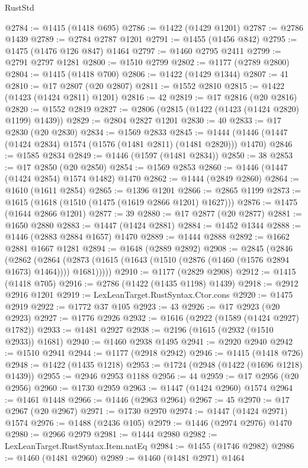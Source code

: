 \begin{lexlean}{RustStd}
\begin{coremodule}
@2784 := @1415 (@1418 @695)
@2786 := @1422 (@1429 @1201)
@2787 := @2786 @1439
@2789 := @2784 @2787 @1201
@2791 := @1455 (@1456 @842)
@2795 := @1475 (@1476 @126 @847) @1464
@2797 := @1460 @2795 @2411
@2799 := @2791 @2797 @1281
@2800 := @1510 @2799
@2802 := @1177 (@2789 @2800)
@2804 := @1415 (@1418 @700)
@2806 := @1422 (@1429 @1344)
@2807 := 41
@2810 := @17 @2807 (@20 @2807)
@2811 := @1552 @2810
@2815 := @1422 (@1423 (@1424 @2811) @1201)
@2816 := 42
@2819 := @17 @2816 (@20 @2816)
@2820 := @1552 @2819
@2827 := @2806 (@2815 (@1422 (@1423 (@1424 @2820) @1199) @1439))
@2829 := @2804 @2827 @1201
@2830 := 40
@2833 := @17 @2830 (@20 @2830)
@2834 := @1569 @2833
@2845 := @1444 (@1446 (@1447 (@1424 @2834) @1574 (@1576 (@1481 @2811) (@1481 @2820))) @1470)
@2846 := @1585 @2834
@2849 := @1446 (@1597 (@1481 @2834))
@2850 := 38
@2853 := @17 @2850 (@20 @2850)
@2854 := @1569 @2853
@2860 := @1446 (@1447 (@1424 @2854) @1574 @1482) @1470
@2862 := @1444 (@2849 @2860)
@2864 := @1610 (@1611 @2854)
@2865 := @1396 @1201
@2866 := @2865 @1199
@2873 := @1615 (@1618 (@1510 (@1475 (@1619 @2866 @1201) @1627)))
@2876 := @1475 (@1644 @2866 @1201)
@2877 := 39
@2880 := @17 @2877 (@20 @2877)
@2881 := @1650 @2880
@2883 := @1447 (@1424 @2881)
@2884 := @1452 @1344
@2888 := @1446 (@2883 @2884 @1657) @1470
@2889 := @1444 @2888
@2892 := @1662 @2881 @1667 @1281
@2894 := @1648 (@2889 @2892)
@2908 := @2845
    (@2846
      (@2862
        (@2864 (@2873 (@1615 (@1643 (@1510 (@2876 (@1460 (@1576 @2894 @1673) @1464)))) @1681)))))
@2910 := @1177 (@2829 @2908)
@2912 := @1415 (@1418 @705)
@2916 := @2786 (@1422 (@1435 @1198) @1439)
@2918 := @2912 @2916 @1201
@2919 := LexLeanTarget.RustSyntax.Ctor.cons
@2920 := @1475 @2919
@2922 := @1772 @37 @105
@2923 := 43
@2926 := @17 @2923 (@20 @2923)
@2927 := @1776 @2926
@2932 := @1616 (@2922 (@1589 (@1424 @2927) @1782))
@2933 := @1481 @2927
@2938 := @2196 (@1615 (@2932 (@1510 @2933)) @1681)
@2940 := @1460 @2938 @1495
@2941 := @2920 @2940
@2942 := @1510 @2941
@2944 := @1177 (@2918 @2942)
@2946 := @1415 (@1418 @726)
@2948 := @1422 (@1435 @1218)
@2953 := @1724 (@2948 (@1422 (@1696 @1218) @1439))
@2955 := @2946 @2953 @1188
@2956 := 44
@2959 := @17 @2956 (@20 @2956)
@2960 := @1730 @2959
@2963 := @1447 (@1424 @2960) @1574
@2964 := @1461 @1448
@2966 := @1446 (@2963 @2964)
@2967 := 45
@2970 := @17 @2967 (@20 @2967)
@2971 := @1730 @2970
@2974 := @1447 (@1424 @2971) @1574
@2976 := @1488 (@2436 @105)
@2979 := @1446 (@2974 @2976) @1470
@2980 := @2966 @2979
@2981 := @1444 @2980
@2982 := LexLeanTarget.RustSyntax.Item.natEq
@2984 := @1455 (@1746 @2982)
@2986 := @1460 (@1481 @2960)
@2989 := @1460 (@1481 @2971) @1464

\end{coremodule}
\end{lexlean}
